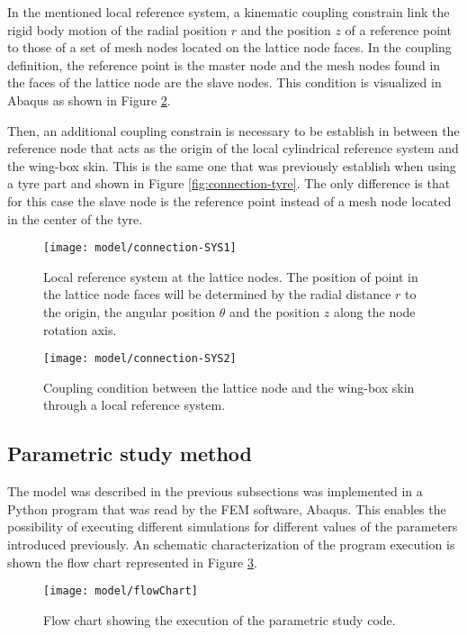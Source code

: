 In the mentioned local reference system, a kinematic coupling constrain link the rigid body motion of the radial position $r$ and the position $z$ of a reference point to those of a set of mesh nodes located on the lattice node faces. In the coupling definition, the reference point is the master node and the mesh nodes found in the faces of the lattice node are the slave nodes. This condition is visualized in Abaqus as shown in Figure \ref{fig:connection-localSYS2}.

Then, an additional coupling constrain is necessary to be establish in between the reference node that acts as the origin of the local cylindrical reference system and the wing-box skin. This is the same one that was previously establish when using a tyre part and shown in Figure \ref{fig:connection-tyre}. The only difference is that for this case the slave node is the reference point instead of a mesh node located in the center of the tyre.

\begin{figure}[!htpb]
  \centering
  \texttt{[image: model/connection-SYS1]}
  \caption[Local reference system at the lattice nodes]{Local reference system at the lattice nodes. The position of point in the lattice node faces will be determined by the radial distance $r$ to the origin, the angular position $\theta$ and the position $z$ along the node rotation axis.}\label{fig:connection-localSYS1}
\end{figure}

\begin{figure}[!htpb]
  \centering
  \texttt{[image: model/connection-SYS2]}
  \caption[Coupling condition between the lattice node and the wing-box skin through a local reference system]{Coupling condition between the lattice node and the wing-box skin through a local reference system. }\label{fig:connection-localSYS2}
\end{figure}

\clearpage
\subsection{Parametric study method} \label{subsec:parametricStudy_computationalModel}

The model was described in the previous subsections was implemented in a Python program that was read by the FEM software, Abaqus. This enables the possibility of executing different simulations for different values of the parameters introduced previously. An schematic characterization of the program execution is shown the flow chart represented in Figure \ref{fig:flowChart}.

\begin{figure}[!htpb]
  \centering
  \texttt{[image: model/flowChart]}
  \caption[Flow chart showing the execution of the parametric study code]{Flow chart showing the execution of the parametric study code. }\label{fig:flowChart}
\end{figure}
